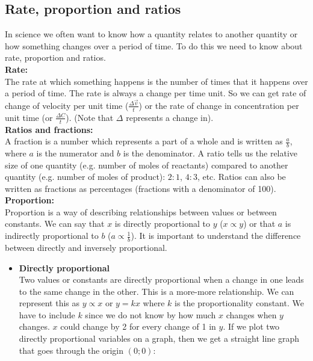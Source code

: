 \begin{enumerate}[label=\textbf{\arabic*}.]
\subsection*{Rate, proportion and ratios}
In science we often want to know how a quantity relates to another quantity or how something changes over a period of time. To do this we need to know about rate, proportion and ratios. \\
\textbf{Rate:}\\
The rate at which something happens is the number of times that it happens over a period of time. The rate is always a change per time unit. So we can get rate of change of velocity per unit time ($\frac{\Delta \vec{v}}{t}$) or the rate of change in concentration per unit time (or $\frac{\Delta{C}}{t}$). (Note that $\Delta$ represents a change in). \\
\textbf{Ratios and fractions:}\\
A fraction is a number which represents a part of a whole and is written as $\frac{a}{b}$, where $a$ is the numerator and $b$ is the denominator. A ratio tells us the relative size of one quantity (e.g. number of moles of reactants) compared to another quantity (e.g. number of moles of product): $2:1$, $4:3$, etc. Ratios can also be written as fractions as percentages (fractions with a denominator of 100). \\
\textbf{Proportion:}\\
Proportion is a way of describing relationships between values or between constants. We can say that $x$ is directly proportional to $y$ ($x \propto y$) or that $a$ is indirectly proportional to $b$ ($a \propto \frac{1}{b}$). It is important to understand the difference between directly and inversely proportional.
\begin{itemize}
 \item \textbf{Directly proportional}\\
Two values or constants are directly proportional when a change in one leads to the same change in the other. This is a more-more relationship. We can represent this as $y \propto x$ or $y = kx$ where $k$ is the proportionality constant. We have to include $k$ since we do not know by how much $x$ changes when $y$ changes. $x$ could change by 2 for every change of 1 in $y$. If we plot two directly proportional variables on a graph, then we get a straight line graph that goes through the origin $(0;0)$:
\\
 

\end{itemize}
\end{enumerate}
